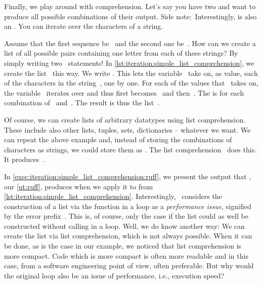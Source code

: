 Finally, we play around with  comprehension.
Let's say you have two  and want to produce all possible combinations of their output.
Side note:~Interestingly,  is also an .
You can iterate over the characters of a string.

Assume that the first sequence be~ and the second one be~.
How can we create a list of all possible pairs containing one letter from each of these strings?
By simply writing two ~statements!
In \cref{lst:iteration:simple_list_comprehension}, we create the list~ this way.
We write .
This lets the variable~ take on, as value, each of the characters in the string~, one by one.
For each of the values that~ takes on, the variable~ iterates over  and thus first becomes~ and then~.
The   is  for each combination of~ and~.
The result is thus the list~\pythonil{["ax", "ay", "bx", "by", "cx", "cy"]}.%
%
\begin{sloppypar}%
Of course, we can create lists of arbitrary datatypes using list comprehension.
These include also other lists, tuples, sets, dictionaries -- whatever we want.
We can repeat the above example and, instead of storing the combinations of characters as strings, we could store them as .
The list comprehension~ does this.
It produces~\pythonil{[(\"a\", \"x\"), (\"a\", \"y\"), (\"b\", \"x\"), (\"b\", \"y\"), (\"c\", \"x\"), (\"c\", \"y\")]}.
\end{sloppypar}%
%
In \cref{exec:iteration:simple_list_comprehension:ruff}, we present the output that \ruff, our \cref{ut:ruff}, produces when we apply it to  from \cref{lst:iteration:simple_list_comprehension}.
Interestingly, \ruff\ considers the construction of a list via the  function in a loop as a \emph{performance issue}, signified by the error prefix~.
This is, of course, only the case if the list could as well be constructed without calling  in a loop.
Well, we do know another way:
We can create the list via list comprehension, which is not always possible.
When it can be done, as is the case in our example, we noticed that list comprehension is more compact.
Code which is more compact is often more readable and in this case, from a software engineering point of view, often preferable.
But why would the original loop also be an issue of performance, i.e., execution speed?

